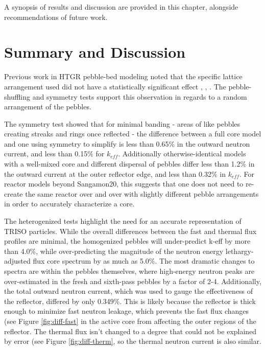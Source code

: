 A synopsis of results and discussion are provided in this chapter, alongside recommendations of future work.

\section{Summary and Discussion}

Previous work in HTGR pebble-bed modeling noted that the specific lattice arrangement used did not have a statistically significant effect \cite{turkmen_effect_2012}, \cite{karriem_mcnp_2001}, \cite{brown_stochastic_2005}.  The pebble-shuffling and symmetry tests support this observation in regards to a  random arrangement of the pebbles.

The symmetry test showed that for minimal banding - areas of like pebbles creating streaks and rings once reflected - the difference between a full core model and one using symmetry to simplify is less than 0.65\% in the outward neutron current, and less than 0.15\% for $k_{eff}$.  Additionally otherwise-identical models with a well-mixed core and different dispersal of pebbles differ less than 1.2\% in the outward current at the outer reflector edge, and less than 0.32\% in $k_{eff}$.  For reactor models beyond Sangamon20, this suggests that one does not need to re-create the same reactor over and over with slightly different pebble arrangements in order to accurately characterize a core.

The heterogenized tests highlight the need for an accurate representation of TRISO particles.  While the overall differences between the fast and thermal flux profiles are minimal, the homogenized pebbles will under-predict k-eff by more than 4.0\%, while over-predicting the magnitude of the neutron energy lethargy-adjusted flux core spectrum by as much as 5.0\%.  The most dramatic changes to spectra are within the pebbles themselves, where high-energy neutron peaks are over-estimated in the fresh and sixth-pass pebbles by a factor of 2-4.  Additionally, the total outward neutron current, which was used to gauge the effectiveness of the reflector, differed by only 0.349\%.  This is likely because the reflector is thick enough to minimize fast neutron leakage, which prevents the fast flux changes (see Figure \ref{fig:diff-fast} in the active core from affecting the outer regions of the reflector. The thermal flux isn't changed to a degree that could not be explained by error (see Figure \ref{fig:diff-therm}, so the thermal neutron current is also similar.

